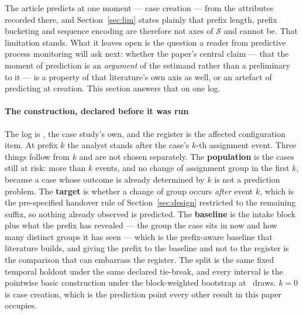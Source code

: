 The article predicts at one moment --- case creation --- from the attributes
recorded there, and Section~\ref{sec:lim} states plainly that prefix length,
prefix bucketing and sequence encoding are therefore not axes of
$\mathcal{S}$ and cannot be. That limitation stands. What it leaves open is
the question a reader from predictive process monitoring will ask next:
whether the paper's central claim --- that the moment of prediction is an
\emph{argument} of the estimand rather than a preliminary to it --- is a
property of that literature's own axis as well, or an artefact of predicting
at creation. This section answers that on one log.

\paragraph{The construction, declared before it was run}
The log is \prefixLog, the case study's own, and the register is the affected
configuration item. At prefix $k$ the analyst stands after the case's $k$-th
assignment event. Three things follow from $k$ and are not chosen
separately. The \textbf{population} is the cases still at risk: more than $k$
events, and no change of assignment group in the first $k$, because a case
whose outcome is already determined by $k$ is not a prediction problem. The
\textbf{target} is whether a change of group occurs \emph{after} event $k$,
which is the pre-specified handover rule of Section~\ref{sec:design} restricted
to the remaining suffix, so nothing already observed is predicted. The
\textbf{baseline} is the intake block plus what the prefix has revealed ---
the group the case sits in now and how many distinct groups it has seen ---
which is the prefix-aware baseline that literature builds, and giving the
prefix to the baseline and not to the register is the comparison that can
embarrass the register. The split is the same fixed temporal holdout under
the same declared tie-break, and every interval is the pointwise basic
construction under the block-weighted bootstrap at \nPrefixDraws\ draws.
$k = 0$ is case creation, which is the prediction point every other result in
this paper occupies.




